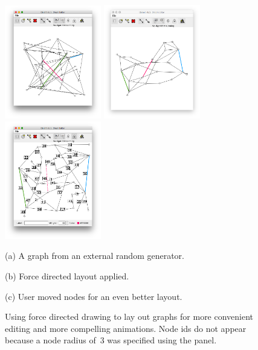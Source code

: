 \begin{figure}
  \begin{center}

    \hspace*{-4em}
    \includegraphics[width=0.375\textwidth]{X-r_25_40_1}
    \hspace{-2em}
    \includegraphics[width=0.375\textwidth]{X-r_25_40_1-fd}
    \hspace{-2em}
    \includegraphics[width=0.375\textwidth]{X-r_25_40_1-edited}

    \hspace*{-4em}
    \parbox[c][3ex][c]{0.35\textwidth}{
      (a) A graph from an external random generator.
    }
    \parbox[c][3ex][c]{0.35\textwidth}{
    (b) Force directed layout applied.
    }
    \parbox[c][3ex][c]{0.35\textwidth}{
    (c) User moved nodes for an even better layout.
    }

  \end{center}

  \bigskip
  \caption{Using force directed drawing to lay out graphs for more convenient
    editing and more compelling animations. Node ids do not appear because
    a node radius of~3 was specified using the
     panel.}

  \label{fig:force_directed}
\end{figure}

